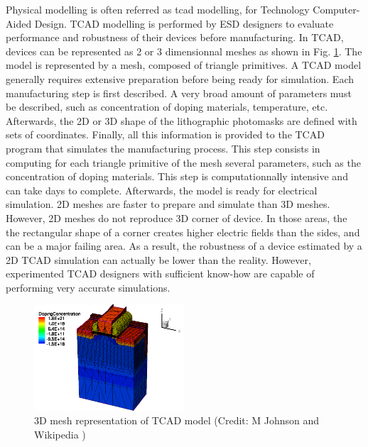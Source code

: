 Physical modelling is often referred as \gls{tcad} modelling, for Technology Computer-Aided Design.
TCAD modelling is performed by ESD designers to evaluate performance and robustness of their devices before manufacturing.
In TCAD, devices can be represented as 2 or 3 dimensionnal meshes as shown in Fig. \ref{fig:esd-protection-tcad-model}.
The model is represented by a mesh, composed of triangle primitives.
A TCAD model generally requires extensive preparation before being ready for simulation.
Each manufacturing step is first described.
A very broad amount of parameters must be described, such as concentration of doping materials, temperature, etc.
Afterwards, the 2D or 3D shape of the lithographic photomasks are defined with sets of coordinates.
Finally, all this information is provided to the TCAD program that simulates the manufacturing process.
This step consists in computing for each triangle primitive of the mesh several parameters, such as the concentration of doping materials.
This step is computationnally intensive and can take days to complete.
Afterwards, the model is ready for electrical simulation.
2D meshes are faster to prepare and simulate than 3D meshes.
However, 2D meshes do not reproduce 3D corner of device.
In those areas, the the rectangular shape of a corner creates higher electric fields than the sides, and can be a major failing area.
As a result, the robustness of a device estimated by a 2D TCAD simulation can actually be lower than the reality.
However, experimented TCAD designers with sufficient know-how are capable of performing very accurate simulations.

\begin{figure}[!h]
  \centering
  \includegraphics[width=0.5\textwidth]{src/2/figures/tcad_process.png}
  \caption{3D mesh representation of TCAD model (Credit: M Johnson and Wikipedia \cite{tcad-process})}
  \label{fig:esd-protection-tcad-model}
\end{figure}

